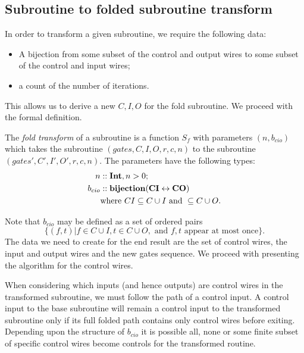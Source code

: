 
\subsection{Subroutine to folded subroutine transform} %
\label{sub:subroutine_to_folded_subroutine_transform}

In order to transform a given subroutine, we require the following data:
\begin{itemize}
  \item A bijection from some subset of the control and output wires to some
  subset of the control and input wires;
  \item a count of the number of iterations.
\end{itemize}

This allows us to derive a new $C,I,O$ for the fold subroutine. We proceed
with the formal definition.
\begin{definition}\label{def:fold_transform_of_a_subroutine}
  The \emph{fold transform} of a subroutine is a function $S_f$ with
  parameters $(n,b_{cio})$ which takes the subroutine $(gates,C,I,O,r,c,n)$
  to the subroutine $(gates',C',I',O',r,c,n)$.
  The parameters have the following types:
  \begin{align*}
    n&::\mathbf{{Int}}, n>0;\\
    b_{cio}&::\mathbf{{bijection(CI \leftrightarrow CO)}} \\
      &\text{where }CI\subseteq C\cup I\text{ and }\subseteq C\cup O.
  \end{align*}
\end{definition}

Note that $b_{cio}$ may be defined as a set of ordered pairs
\begin{equation}
  \{(f,t)|f\in C\cup I, t \in C\cup O,\text{ and } f,t \text{ appear at most once}\}.
  \label{eq:defintion_of_bcio}
\end{equation}
The data we need to create for the end result are the set of control wires,
the input and output wires and the new gates sequence. We proceed with
presenting the algorithm for the control wires.

When considering which inputs (and hence outputs) are control wires in the
transformed subroutine, we must follow the path of a control input. A control
input to the base subroutine will remain a control input to the transformed
subroutine only if its full folded path contains only control wires before
exiting. Depending upon the structure of $b_{cio}$ it is possible all, none
or some finite subset of specific control wires become controls for the
transformed routine.

